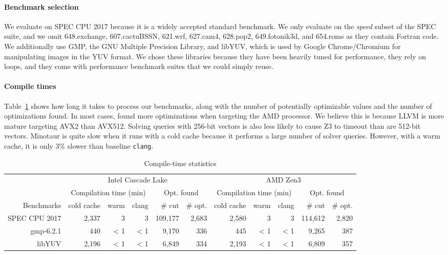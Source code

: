 \paragraph{Benchmark selection}
%
We evaluate on SPEC CPU 2017%
because it is a widely accepted standard
benchmark.
%
We only evaluate on the \emph{speed} subset of the SPEC suite, and we omit
648.exchange, 607.cactuBSSN, 621.wrf, 627.cam4, 628.pop2, 649.fotonik3d,
and 654.roms as they contain Fortran code.
%
We additionally use GMP, the GNU Multiple Precision Library, and libYUV,
which is used by Google Chrome/Chromium for manipulating images in the
YUV format.
%
We chose these libraries because they have been heavily tuned for
performance, they rely on loops, and they come with performance
benchmark suites that we could simply reuse.


\paragraph{Compile times}
%
Table~\ref{tab:compiletime} shows how long it takes \minotaur{} to process
our benchmarks, along with the number of potentially optimizable
values and the number of optimizations found.
%
In most cases, \minotaur{} found more optimizations when targeting the AMD
processor.
%
We believe this is because LLVM is more mature targeting
AVX2 than AVX512.
%
Solving queries with 256-bit vectors is also less likely to cause Z3
to timeout than are 512-bit vectors.
%
Minotaur is quite slow when it runs with a cold cache because it
performs a large number of solver queries.
%
However, with a warm cache, it is only 3\% slower than baseline \texttt{clang}.

\begin{table}[t]
  \centering
  \begin{tabular}{| r | r r  r | r r | r r r | r r |}
    \hline
    \multirow{2}{*}{}& \multicolumn{5}{c|}{Intel Cascade Lake} & \multicolumn{5}{c|}{AMD Zen3} \\
    \cline{2-11}
    & \multicolumn{3}{c|}{Compilation time (min)} & \multicolumn{2}{c|}{Opt. found} & \multicolumn{3}{c|}{Compilation time (min)} & \multicolumn{2}{c|}{Opt. found}  \\
    \hline
    Benchmarks & cold cache & warm & clang & \# cut & \# opt. & cold cache & warm & clang & \# cut & \# opt. \\
    \hline\hline
    SPEC CPU 2017 & 2,337 & 3 & 3 & 109,177 & 2,683 & 2,580 & 3 & 3 & 114,612 & 2,820 \\
    \hline
    gmp-6.2.1 & 440 & < 1 & < 1 & 9,170 & 336 & 445 & < 1 & < 1 & 9,265 & 387\\
    \hline
    libYUV & 2,196 & < 1 & < 1 & 6,849 & 334  & 2,193 & < 1 & < 1 & 6,809 & 357 \\
    \hline
  \end{tabular}
  \caption{Compile-time statistics}
  \label{tab:compiletime}
\end{table}

